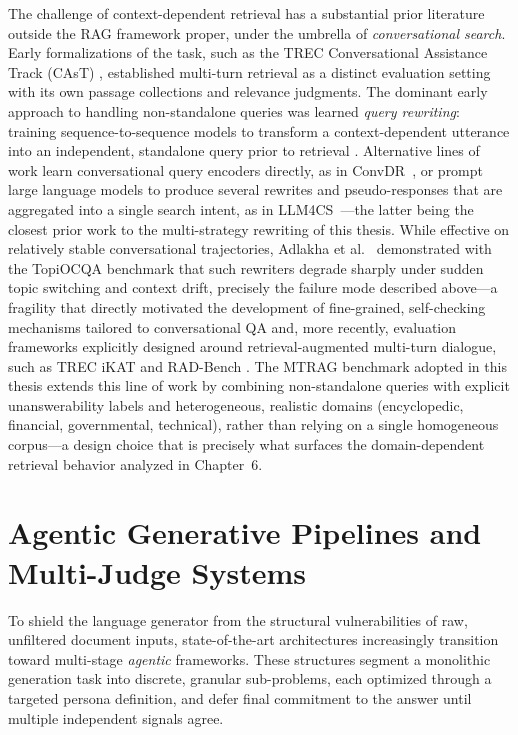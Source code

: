 The challenge of context-dependent retrieval has a substantial prior literature outside the RAG framework proper, under the umbrella of \textit{conversational search}. Early formalizations of the task, such as the TREC Conversational Assistance Track (CAsT) \citep{dalton2020trec}, established multi-turn retrieval as a distinct evaluation setting with its own passage collections and relevance judgments. The dominant early approach to handling non-standalone queries was learned \textit{query rewriting}: training sequence-to-sequence models to transform a context-dependent utterance into an independent, standalone query prior to retrieval \citep{vakulenko2021question, anantha2021open}. Alternative lines of work learn conversational query encoders directly, as in ConvDR~\citep{yu2021convdr}, or prompt large language models to produce several rewrites and pseudo-responses that are aggregated into a single search intent, as in LLM4CS~\citep{mao2023llm4cs}---the latter being the closest prior work to the multi-strategy rewriting of this thesis. While effective on relatively stable conversational trajectories, Adlakha et al.\ \citep{adlakha2022topiocqa} demonstrated with the TopiOCQA benchmark that such rewriters degrade sharply under sudden topic switching and context drift, precisely the failure mode described above---a fragility that directly motivated the development of fine-grained, self-checking mechanisms tailored to conversational QA \citep{ye2024boosting} and, more recently, evaluation frameworks explicitly designed around retrieval-augmented multi-turn dialogue, such as TREC iKAT \citep{aliannejadi2024trec} and RAD-Bench \citep{kuo2025radbench}. The MTRAG benchmark adopted in this thesis \citep{katsis2025mtrag} extends this line of work by combining non-standalone queries with explicit unanswerability labels and heterogeneous, realistic domains (encyclopedic, financial, governmental, technical), rather than relying on a single homogeneous corpus---a design choice that is precisely what surfaces the domain-dependent retrieval behavior analyzed in Chapter~6.

\section{Agentic Generative Pipelines and Multi-Judge Systems}
\label{sec:agentic}

To shield the language generator from the structural vulnerabilities of raw, unfiltered document inputs, state-of-the-art architectures increasingly transition toward multi-stage \textit{agentic} frameworks. These structures segment a monolithic generation task into discrete, granular sub-problems, each optimized through a targeted persona definition, and defer final commitment to the answer until multiple independent signals agree.

